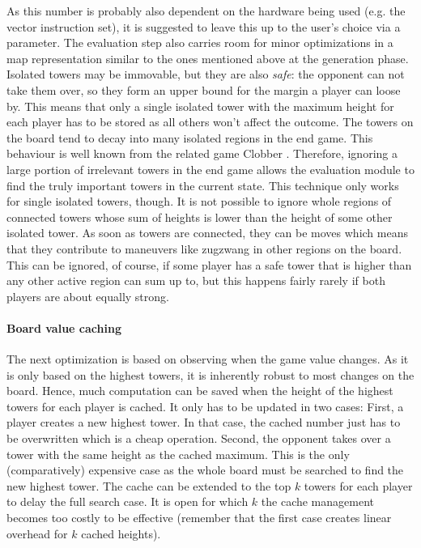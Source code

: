 \documentclass[sigconf]{acmart}
\begin{document}
As this number is probably also dependent on the hardware being used (e.g. the vector instruction set), it is suggested to leave this up to the user's choice via a parameter.
The evaluation step also carries room for minor optimizations in a map representation similar to the ones mentioned above at the generation phase.
Isolated towers may be immovable, but they are also \emph{safe}:
the opponent can not take them over, so they form an upper bound for the margin a player can loose by.
This means that only a single isolated tower with the maximum height for each player has to be stored as all others won't affect the outcome.
The towers on the board tend to decay into many isolated regions in the end game.
This behaviour is well known from the related game Clobber \cite{Althöfer2004}.
Therefore, ignoring a large portion of irrelevant towers in the end game allows the evaluation module to find the truly important towers in the current state.
This technique only works for single isolated towers, though.
It is not possible to ignore whole regions of connected towers whose sum of heights is lower than the height of some other isolated tower.
As soon as towers are connected, they can be moves which means that they contribute to maneuvers like zugzwang in other regions on the board.
This can be ignored, of course, if some player has a safe tower that is higher than any other active region can sum up to, but this happens fairly rarely if both players are about equally strong.

\paragraph{Board value caching}
The next optimization is based on observing when the game value changes.
As it is only based on the highest towers, it is inherently robust to most changes on the board.
Hence, much computation can be saved when the height of the highest towers for each player is cached.
It only has to be updated in two cases:
First, a player creates a new highest tower.
In that case, the cached number just has to be overwritten which is a cheap operation.
Second, the opponent takes over a tower with the same height as the cached maximum.
This is the only (comparatively) expensive case as the whole board must be searched to find the new highest tower.
The cache can be extended to the top $k$ towers for each player to delay the full search case.
It is open for which $k$ the cache management becomes too costly to be effective (remember that the first case creates linear overhead for $k$ cached heights).
\end{document}
